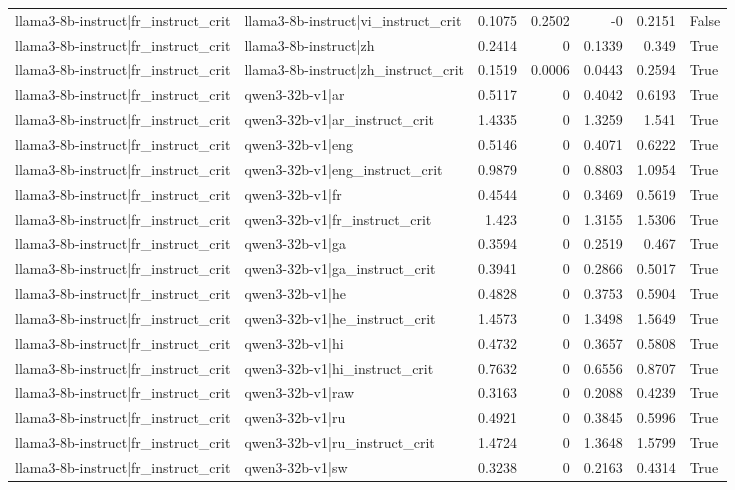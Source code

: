 \begin{table}
\begin{tabular}{l l r r r r l}
llama3-8b-instruct|fr_instruct_crit & llama3-8b-instruct|vi_instruct_crit & 0.1075 & 0.2502 & -0 & 0.2151 & False \\
llama3-8b-instruct|fr_instruct_crit & llama3-8b-instruct|zh & 0.2414 & 0 & 0.1339 & 0.349 & True \\
llama3-8b-instruct|fr_instruct_crit & llama3-8b-instruct|zh_instruct_crit & 0.1519 & 0.0006 & 0.0443 & 0.2594 & True \\
llama3-8b-instruct|fr_instruct_crit & qwen3-32b-v1|ar & 0.5117 & 0 & 0.4042 & 0.6193 & True \\
llama3-8b-instruct|fr_instruct_crit & qwen3-32b-v1|ar_instruct_crit & 1.4335 & 0 & 1.3259 & 1.541 & True \\
llama3-8b-instruct|fr_instruct_crit & qwen3-32b-v1|eng & 0.5146 & 0 & 0.4071 & 0.6222 & True \\
llama3-8b-instruct|fr_instruct_crit & qwen3-32b-v1|eng_instruct_crit & 0.9879 & 0 & 0.8803 & 1.0954 & True \\
llama3-8b-instruct|fr_instruct_crit & qwen3-32b-v1|fr & 0.4544 & 0 & 0.3469 & 0.5619 & True \\
llama3-8b-instruct|fr_instruct_crit & qwen3-32b-v1|fr_instruct_crit & 1.423 & 0 & 1.3155 & 1.5306 & True \\
llama3-8b-instruct|fr_instruct_crit & qwen3-32b-v1|ga & 0.3594 & 0 & 0.2519 & 0.467 & True \\
llama3-8b-instruct|fr_instruct_crit & qwen3-32b-v1|ga_instruct_crit & 0.3941 & 0 & 0.2866 & 0.5017 & True \\
llama3-8b-instruct|fr_instruct_crit & qwen3-32b-v1|he & 0.4828 & 0 & 0.3753 & 0.5904 & True \\
llama3-8b-instruct|fr_instruct_crit & qwen3-32b-v1|he_instruct_crit & 1.4573 & 0 & 1.3498 & 1.5649 & True \\
llama3-8b-instruct|fr_instruct_crit & qwen3-32b-v1|hi & 0.4732 & 0 & 0.3657 & 0.5808 & True \\
llama3-8b-instruct|fr_instruct_crit & qwen3-32b-v1|hi_instruct_crit & 0.7632 & 0 & 0.6556 & 0.8707 & True \\
llama3-8b-instruct|fr_instruct_crit & qwen3-32b-v1|raw & 0.3163 & 0 & 0.2088 & 0.4239 & True \\
llama3-8b-instruct|fr_instruct_crit & qwen3-32b-v1|ru & 0.4921 & 0 & 0.3845 & 0.5996 & True \\
llama3-8b-instruct|fr_instruct_crit & qwen3-32b-v1|ru_instruct_crit & 1.4724 & 0 & 1.3648 & 1.5799 & True \\
llama3-8b-instruct|fr_instruct_crit & qwen3-32b-v1|sw & 0.3238 & 0 & 0.2163 & 0.4314 & True \\

\end{tabular}
\end{table}
